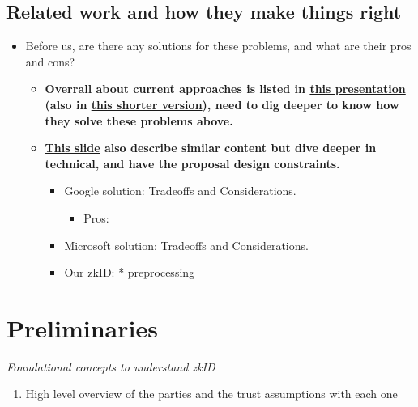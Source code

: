 \documentclass{iacrtrans}
\begin{document}
\subsection{Related work and how they make things right}
\begin{itemize}
    \item Before us, are there any solutions for these problems, and what are their pros and cons?
    \begin{itemize}
        \item \textbf{Overrall about current approaches is listed in \href{https://docs.google.com/presentation/d/1YROCEHK_t10wo5CukgYWmS1nuYKZi46NJBu-XZ8zXiw/edit?slide=id.p\#slide=id.p}{this presentation} (also in \href{https://docs.google.com/presentation/d/1HqFtSiS2hVHaSS8-u-8iecVFeMehMGBtZJnnbnXj83c/edit?slide=id.g34d4bb36836_0_262\#slide=id.g34d4bb36836_0_262}{this shorter version}), 
 need to dig deeper to know how they solve these problems above.}
        \item \textbf{\href{https://docs.google.com/presentation/d/1C4D8zK4gAdafgIEW-2m_qDyyT39gWo0mmFYpwmA8N3M/edit?slide=id.g312b09519cd_0_8\#slide=id.g312b09519cd_0_8}{This slide} also describe similar content but dive deeper in technical, and have the proposal design constraints.}
        \begin{itemize}
            \item Google solution: Tradeoffs and Considerations. 
                \begin{itemize}
                    \item Pros: 
                \end{itemize}
                
            \item Microsoft solution: Tradeoffs and Considerations.
            \item Our zkID:
                * preprocessing 
        \end{itemize}
    \end{itemize} 
\end{itemize}


\section{Preliminaries}
\label{sec:preliminaries}
\textit{Foundational concepts to understand zkID}

\begin{enumerate}
   \item  High level overview of the parties and the trust assumptions with each one
   \
\end{enumerate}
\end{document}
